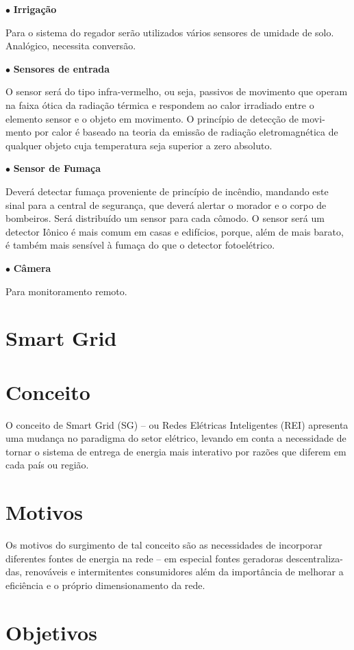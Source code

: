 $\bullet$ \textbf{Irrigação}

	Para o sistema do regador serão utilizados vários sensores de umidade de solo. Analógico, necessita conversão.
	
$\bullet$ \textbf{Sensores de entrada}

	O sensor será do tipo infra-vermelho, ou seja, passivos de movimento que operam na faixa ótica da radiação térmica e respondem ao calor irradiado entre o elemento sensor e o objeto em movimento. O princípio de detecção de movi- mento por calor é baseado na teoria da emissão de radiação eletromagnética de qualquer objeto cuja temperatura seja superior a zero absoluto.

$\bullet$ \textbf{Sensor de Fumaça}

	Deverá detectar fumaça proveniente de princípio de incêndio, mandando este sinal para a central de segurança, que deverá alertar o morador e o corpo de bombeiros. Será distribuído um sensor para cada cômodo. O sensor será um detector Iônico é mais comum em casas e edifícios, porque, além de mais barato, é também mais sensível à fumaça do que o detector fotoelétrico.

$\bullet$ \textbf{Câmera}

	Para monitoramento remoto.

\section{Smart Grid}
\section{Conceito}

	O conceito de Smart Grid (SG) – ou Redes Elétricas Inteligentes (REI) apresenta uma mudança no paradigma do setor elétrico, levando em conta a necessidade de tornar o sistema de entrega de energia mais interativo por razões que diferem em cada país ou região.

\section{Motivos}

	Os motivos do surgimento de tal conceito são as necessidades de incorporar diferentes fontes de energia na rede – em especial fontes geradoras descentraliza- das, renováveis e intermitentes consumidores além da importância de melhorar a eficiência e o próprio dimensionamento da rede.

\section{Objetivos}

